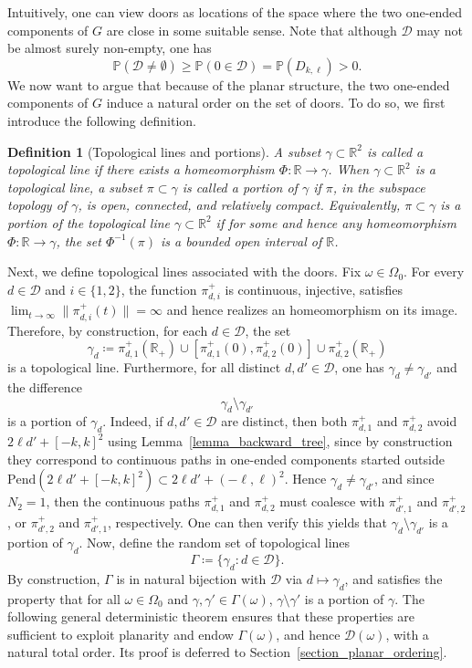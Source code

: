 \documentclass[a4paper, 11pt]{article} %
\theoremstyle{plain}
\newtheorem{definition}[theorem]{Definition}
\newcommand{\backward}{\mathrm{Pend}}
\newcommand{\D}{\mathcal D}
\newcommand{\R}{\mathbb{R}}
\newcommand{\1}{\mathds 1}
\renewcommand{\P}{\mathbb{P}}
\numberwithin{equation}{section}
\begin{document}
Intuitively, one can view doors as locations of the space where the two one-ended components of $G$ are close in some suitable sense. Note that although $\D$ may not be almost surely non-empty, one has
    \[\P(\D\neq\emptyset)\geq\P(0\in\D)=\P(D_{k,\ell})>0.\]
We now want to argue that because of the planar structure, the two one-ended components of $G$ induce a natural order on the set of doors. To do so, we first introduce the following definition.


\begin{definition}[Topological lines and portions]
    A subset $\gamma\subset\R^2$ is called a \emph{topological line} if there exists a homeomorphism $\Phi:\R\to\gamma$. When $\gamma\subset\R^2$ is a topological line, a subset $\pi\subset\gamma$ is called a \emph{portion} of $\gamma$ if $\pi$, in the subspace topology of $\gamma$, is open, connected, and relatively compact. Equivalently, $\pi\subset\gamma$ is a portion of the topological line $\gamma\subset\R^2$ if for some and hence any homeomorphism $\Phi:\R\to\gamma$, the set $\Phi^{-1}(\pi)$ is a bounded open interval of $\R$.
\end{definition}


Next, we define topological lines associated with the doors. Fix $\omega\in\Omega_0$. For every $d\in\D$ and $i\in\{1,2\}$, the function $\pi_{d,i}^+$ is continuous, injective, satisfies $\lim_{t\to\infty}\|\pi_{d, i}^+(t)\|=\infty$ and hence realizes an homeomorphism on its image. Therefore, by construction, for each $d\in\D$, the set
    \[\gamma_d\coloneqq\pi_{d,1}^+(\R_+)\cup[\pi_{d,1}^+(0), \pi_{d,2}^+(0)]\cup\pi_{d,2}^+(\R_+)\]
is a topological line. Furthermore, for all distinct $d,d'\in\D$, one has $\gamma_d\neq\gamma_{d'}$ and the difference
    \[\gamma_d\setminus\gamma_{d'}\]
is a portion of $\gamma_d$. Indeed, if $d,d'\in\D$ are distinct, then both $\pi_{d,1}^+$ and $\pi_{d,2}^+$ avoid $2\ell d'+[-k,k]^2$ using Lemma~\ref{lemma_backward_tree}, since by construction they correspond to continuous paths in one-ended components started outside $\backward(2\ell d'+[-k,k]^2)\subset 2\ell d'+(-\ell,\ell)^2$. Hence $\gamma_d\neq\gamma_{d'}$, and since $N_2=1$, then the continuous paths $\pi_{d,1}^+$ and $\pi_{d,2}^+$ must coalesce with $\pi_{d',1}^+$ and $\pi_{d',2}^+$, or $\pi_{d',2}^+$ and $\pi_{d',1}^+$, respectively. One can then verify this yields that $\gamma_d\setminus\gamma_{d'}$ is a portion of $\gamma_d$. Now, define the random set of topological lines 
    \[\Gamma\coloneqq\{\gamma_d:d\in\D\}.\]
By construction, $\Gamma$ is in natural bijection with $\D$ via $d\mapsto\gamma_d$, and satisfies the property that for all $\omega\in\Omega_0$ and $\gamma,\gamma'\in\Gamma(\omega)$, $\gamma\setminus\gamma'$ is a portion of $\gamma$. The following general deterministic theorem ensures that these properties are sufficient to exploit planarity and endow $\Gamma(\omega)$, and hence $\D(\omega)$, with a natural total order. Its proof is deferred to Section~\ref{section_planar_ordering}.
\end{document}
